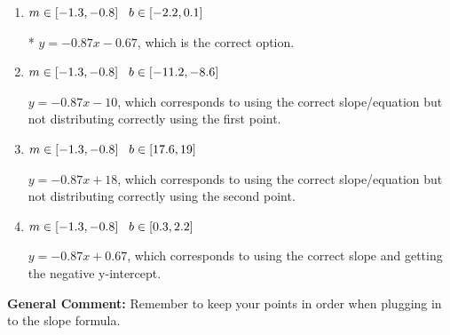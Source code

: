 \documentclass{extbook}[14pt]
\begin{document}
\begin{enumerate}
{\begin{enumerate}[label=\Alph*.]
 $y = 0.87x + 16.67$, which corresponds to using the negative slope and the correct equation.
\item \( m \in [-1.3, -0.8] \hspace*{3mm} b \in [-2.2, 0.1] \)

* $y = -0.87x -0.67$, which is the correct option.
\item \( m \in [-1.3, -0.8] \hspace*{3mm} b \in [-11.2, -8.6] \)

 $y = -0.87x -10$, which corresponds to using the correct slope/equation but not distributing correctly using the first point.
\item \( m \in [-1.3, -0.8] \hspace*{3mm} b \in [17.6, 19] \)

 $y = -0.87x + 18$, which corresponds to using the correct slope/equation but not distributing correctly using the second point.
\item \( m \in [-1.3, -0.8] \hspace*{3mm} b \in [0.3, 2.2] \)

 $y = -0.87x + 0.67$, which corresponds to using the correct slope and getting the negative y-intercept.
\end{enumerate}

\textbf{General Comment:} Remember to keep your points in order when plugging in to the slope formula.
}
\end{enumerate}
\end{document}
